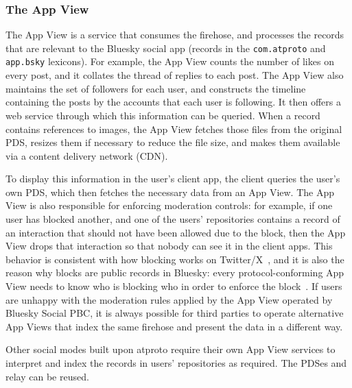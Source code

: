 \documentclass[sigconf]{acmart}
\begin{document}

\subsubsection{The App View}\label{sec:appview}

The App View is a service that consumes the firehose, and processes the records that are relevant to the Bluesky social app (records in the \texttt{com.atproto} and \texttt{app.bsky} lexicons).
For example, the App View counts the number of likes on every post, and it collates the thread of replies to each post.
The App View also maintains the set of followers for each user, and constructs the timeline containing the posts by the accounts that each user is following.
It then offers a web service through which this information can be queried.
When a record contains references to images, the App View fetches those files from the original PDS, resizes them if necessary to reduce the file size, and makes them available via a content delivery network (CDN).

To display this information in the user's client app, the client queries the user's own PDS, which then fetches the necessary data from an App View.
The App View is also responsible for enforcing moderation controls: for example, if one user has blocked another, and one of the users' repositories contains a record of an interaction that should not have been allowed due to the block, then the App View drops that interaction so that nobody can see it in the client apps.
This behavior is consistent with how blocking works on Twitter/X~\cite{TwitterBlock}, and it is also the reason why blocks are public records in Bluesky: every protocol-conforming App View needs to know who is blocking who in order to enforce the block~\cite{PublicBlocks,PrivateBlocks}.
If users are unhappy with the moderation rules applied by the App View operated by Bluesky Social PBC, it is always possible for third parties to operate alternative App Views that index the same firehose and present the data in a different way.

Other social modes built upon atproto require their own App View services to interpret and index the records in users' repositories as required.
The PDSes and relay can be reused.
\end{document}
